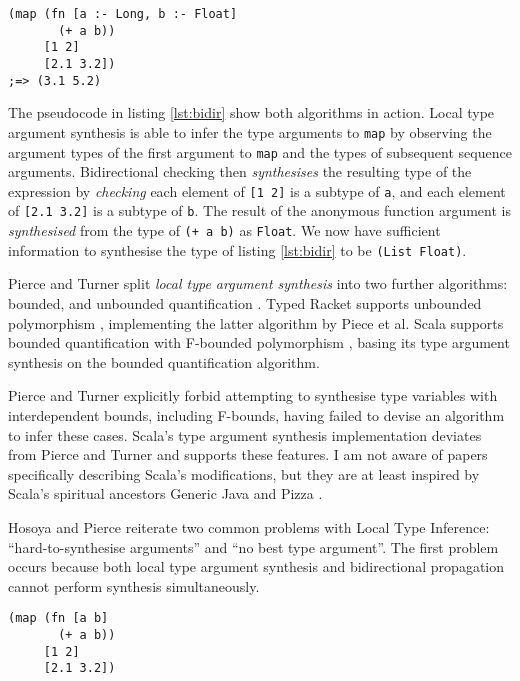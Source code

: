 \begin{lstlisting}[caption=Bidirectional checking algorithm with Typed Clojure pseudocode, label=lst:bidir]
(map (fn [a :- Long, b :- Float]
       (+ a b))
     [1 2]
     [2.1 3.2])
;=> (3.1 5.2)
\end{lstlisting}

The pseudocode in listing \ref{lst:bidir} show both algorithms in action. Local type argument synthesis is able
to infer the type arguments to \lstinline|map| by observing the argument types of the first
argument to \lstinline|map| and the types of subsequent sequence arguments. Bidirectional checking
then \emph{synthesises} the resulting type of the expression by \emph{checking} each element
of \lstinline|[1 2]| is a subtype of \lstinline|a|, and each element of \lstinline|[2.1 3.2]| is a subtype of
\lstinline|b|. The result of the anonymous function argument is \emph{synthesised} from the type of
\lstinline|(+ a b)| as \lstinline|Float|. We now have sufficient information to 
synthesise the type of listing \ref{lst:bidir} to be \lstinline|(List Float)|.

Pierce and Turner split \emph{local type argument synthesis} into two further
algorithms: bounded, and unbounded quantification \cite{PT00}. 
Typed Racket 
supports unbounded polymorphism \cite{Tob10}, implementing the latter algorithm by Piece et al.
Scala supports bounded quantification with F-bounded polymorphism \cite{CCHOM89},
basing its type argument synthesis on the bounded quantification algorithm.

Pierce and Turner explicitly forbid \cite{PT00}
attempting to synthesise type variables with interdependent bounds, including
F-bounds, having failed to devise an algorithm to infer these cases.
Scala's type argument synthesis implementation deviates from Pierce and Turner and supports these features.
I am not aware of papers specifically describing Scala's modifications, but they are at least inspired by
Scala's spiritual ancestors Generic Java \cite{BOSW98} and Pizza \cite{OW97}.

Hosoya and Pierce \cite{HP99} reiterate two common problems with Local Type Inference:
``hard-to-synthesise arguments'' and ``no best type argument''. The first problem occurs because
both local type argument synthesis and bidirectional propagation cannot perform synthesis
simultaneously. 

\begin{lstlisting}[caption=Hard-to-synthesise expression, label=lst:hts]
(map (fn [a b] 
       (+ a b)) 
     [1 2] 
     [2.1 3.2])
\end{lstlisting}

